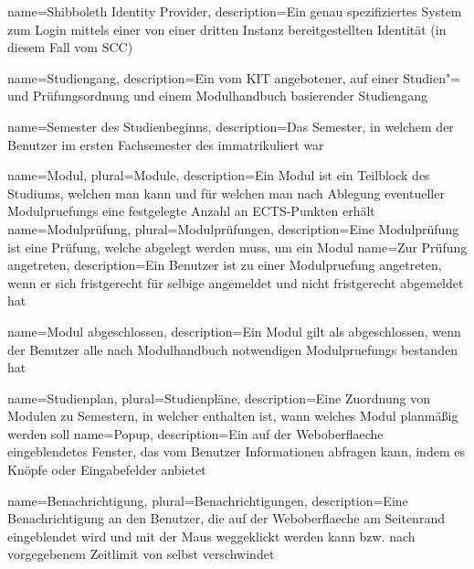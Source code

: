 {
	name=Shibboleth Identity Provider,
	description={Ein genau spezifiziertes System zum Login mittels einer von einer dritten Instanz bereitgestellten Identität (in diesem Fall vom \gls{SCC})}
}

{
	name=Studiengang,
	description={Ein vom KIT angebotener, auf einer Studien"= und Prüfungsordnung und einem Modulhandbuch basierender Studiengang}
}

{
	name=Semester des Studienbeginns,
	description={Das Semester, in welchem der \gls{Benutzer} im ersten Fachsemester des  immatrikuliert war}
}

{
	name=Modul,
	plural=Module,
	description={Ein Modul ist ein Teilblock des Studiums, welchen man  kann und für welchen man nach Ablegung eventueller \glspl{Modulpruefung} eine festgelegte Anzahl an ECTS-Punkten erhält}
}
{
	name=Modulprüfung,
	plural=Modulprüfungen,
	description={Eine Modulprüfung ist eine Prüfung, welche abgelegt werden muss, um ein Modul }
}
{
	name=Zur Prüfung angetreten,
	description={Ein \gls{Benutzer} ist zu einer \gls{Modulpruefung} angetreten, wenn er sich fristgerecht für selbige angemeldet und nicht fristgerecht abgemeldet hat}
}

{
	name=Modul abgeschlossen,
	description={Ein \gls{Modul} gilt als abgeschlossen, wenn der \gls{Benutzer} alle nach Modulhandbuch notwendigen \glspl{Modulpruefung} bestanden hat}
}

{
	name=Studienplan,
	plural=Studienpläne,
	description={Eine Zuordnung von Modulen zu Semestern, in welcher enthalten ist, wann welches Modul planmäßig  werden soll}
}
{
	name=Popup,
	description={Ein auf der \gls{Weboberflaeche} eingeblendetes Fenster, das vom \gls{Benutzer} Informationen abfragen kann, indem es Knöpfe oder Eingabefelder anbietet}
}

{
	name=Benachrichtigung,
	plural=Benachrichtigungen,
	description={Eine Benachrichtigung an den \gls{Benutzer}, die auf der \gls{Weboberflaeche} am Seitenrand eingeblendet wird und mit der Maus weggeklickt werden kann bzw. nach vorgegebenem Zeitlimit von selbst verschwindet}
}

